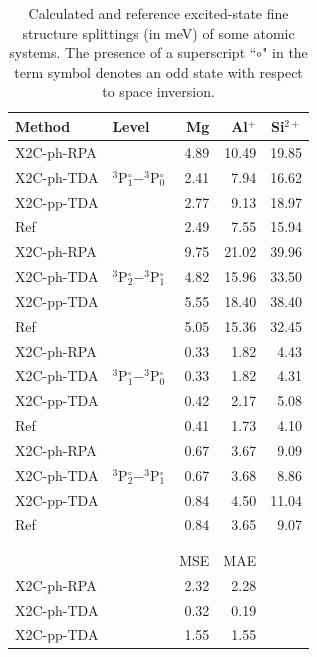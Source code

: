 \begin{table}[htbp]
  \caption{Calculated and reference\cite{NIST_ASD} excited-state fine structure splittings (in meV) of some atomic systems. The presence of a superscript ``$\circ$" in the term symbol denotes an odd state with respect to space inversion.}
 \label{tb:SingleEx}
 \centering
 \begin{tabular}{llrrr}
  \hline
  Method     & Level                                              &  Mg   & Al$^+$ & Si$^{2+}$ \\ \hline
  X2C-ph-RPA & \multirow{3}{*}{$^3$P$^\circ_{1}-^3$P$^\circ_{0}$} &  4.89 & 10.49  & 19.85 \\
  X2C-ph-TDA &                                                    &  2.41 &  7.94  & 16.62 \\
  X2C-pp-TDA &                                                    &  2.77 &  9.13  & 18.97 \\
  Ref        &                                                    &  2.49 &  7.55  & 15.94 \\
  \hline
  X2C-ph-RPA & \multirow{3}{*}{$^3$P$^\circ_{2}-^3$P$^\circ_{1}$} &  9.75 & 21.02  & 39.96 \\
  X2C-ph-TDA &                                                    &  4.82 & 15.96  & 33.50 \\
  X2C-pp-TDA &                                                    &  5.55 & 18.40  & 38.40 \\
  Ref        &                                                    &  5.05 & 15.36  & 32.45 \\
  \hline
  X2C-ph-RPA & \multirow{3}{*}{$^3$P$^\circ_{1}-^3$P$^\circ_{0}$} &  0.33 &  1.82  &  4.43 \\
  X2C-ph-TDA &                                                    &  0.33 &  1.82  &  4.31 \\
  X2C-pp-TDA &                                                    &  0.42 &  2.17  &  5.08 \\
  Ref        &                                                    &  0.41 &  1.73  &  4.10 \\
  \hline
  X2C-ph-RPA & \multirow{3}{*}{$^3$P$^\circ_{2}-^3$P$^\circ_{1}$} &  0.67 &  3.67  &  9.09 \\
  X2C-ph-TDA &                                                    &  0.67 &  3.68  &  8.86 \\
  X2C-pp-TDA &                                                    &  0.84 &  4.50  & 11.04 \\
  Ref        &                                                    &  0.84 &  3.65  &  9.07 \\ 
  \hline
  \\
  \\
             &  &  MSE  &  MAE   & \\
  \hline
  X2C-ph-RPA &  &  2.32 &  2.28  & \\
  X2C-ph-TDA &  &  0.32 &  0.19  & \\
  X2C-pp-TDA &  &  1.55 &  1.55  & \\
  \hline
 \end{tabular}
\end{table}

